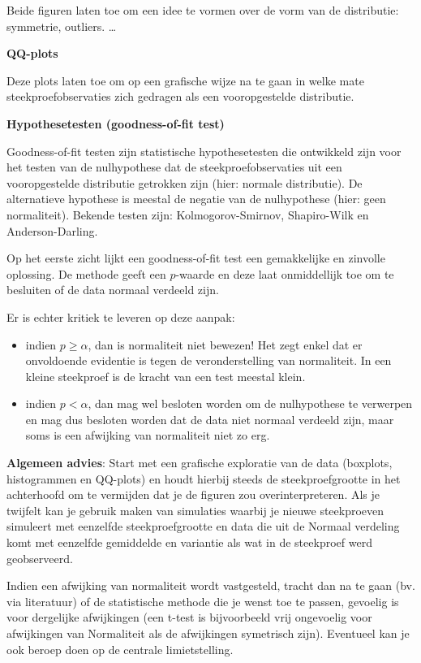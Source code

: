\documentclass[12pt,dutch,coursenotes]{book}
\providecommand{\tightlist}{%
  \setlength{\itemsep}{0pt}\setlength{\parskip}{0pt}}
\theoremstyle{definition}
\theoremstyle{definition}
\theoremstyle{definition}
\theoremstyle{remark}
\begin{document}
Beide figuren laten toe om een idee te vormen over de vorm van de
distributie: symmetrie, outliers. \ldots

\textbf{QQ-plots}

Deze plots laten toe om op een grafische wijze na te gaan in welke mate
steekproefobservaties zich gedragen als een vooropgestelde distributie.

\textbf{Hypothesetesten (goodness-of-fit test)}

Goodness-of-fit testen zijn statistische hypothesetesten die ontwikkeld
zijn voor het testen van de nulhypothese dat de steekproefobservaties
uit een vooropgestelde distributie getrokken zijn (hier: normale
distributie). De alternatieve hypothese is meestal de negatie van de
nulhypothese (hier: geen normaliteit). Bekende testen zijn:
Kolmogorov-Smirnov, Shapiro-Wilk en Anderson-Darling.

Op het eerste zicht lijkt een goodness-of-fit test een gemakkelijke en
zinvolle oplossing. De methode geeft een \(p\)-waarde en deze laat
onmiddellijk toe om te besluiten of de data normaal verdeeld zijn.

Er is echter kritiek te leveren op deze aanpak:

\begin{itemize}
\tightlist
\item
  indien \(p\geq \alpha\), dan is normaliteit niet bewezen! Het zegt
  enkel dat er onvoldoende evidentie is tegen de veronderstelling van
  normaliteit. In een kleine steekproef is de kracht van een test
  meestal klein.
\item
  indien \(p<\alpha\), dan mag wel besloten worden om de nulhypothese te
  verwerpen en mag dus besloten worden dat de data niet normaal verdeeld
  zijn, maar soms is een afwijking van normaliteit niet zo erg.
\end{itemize}

\textbf{Algemeen advies}: Start met een grafische exploratie van de data
(boxplots, histogrammen en QQ-plots) en houdt hierbij steeds de
steekproefgrootte in het achterhoofd om te vermijden dat je de figuren
zou overinterpreteren. Als je twijfelt kan je gebruik maken van
simulaties waarbij je nieuwe steekproeven simuleert met eenzelfde
steekproefgrootte en data die uit de Normaal verdeling komt met
eenzelfde gemiddelde en variantie als wat in de steekproef werd
geobserveerd.

Indien een afwijking van normaliteit wordt vastgesteld, tracht dan na te
gaan (bv. via literatuur) of de statistische methode die je wenst toe te
passen, gevoelig is voor dergelijke afwijkingen (een t-test is
bijvoorbeeld vrij ongevoelig voor afwijkingen van Normaliteit als de
afwijkingen symetrisch zijn). Eventueel kan je ook beroep doen op de
centrale limietstelling.
\end{document}
